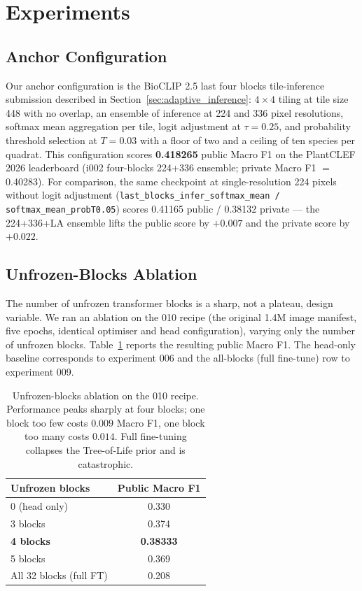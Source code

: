 \documentclass[sigconf]{ceurart}
\begin{document}
\section{Experiments}
\label{sec:experiments}
\subsection{Anchor Configuration}
Our anchor configuration is the BioCLIP 2.5 last four blocks tile-inference submission described in Section~\ref{sec:adaptive_inference}: $4{\times}4$ tiling at tile size 448 with no overlap, an ensemble of inference at 224 and 336 pixel resolutions, softmax mean aggregation per tile, logit adjustment at $\tau{=}0.25$, and probability threshold selection at $T{=}0.03$ with a floor of two and a ceiling of ten species per quadrat. This configuration scores \textbf{0.418265} public Macro F1 on the PlantCLEF 2026 leaderboard (i002 four-blocks 224+336 ensemble; private Macro F1 $=$ 0.40283). For comparison, the same checkpoint at single-resolution 224 pixels without logit adjustment (\texttt{last\_blocks\_infer\_softmax\_mean / softmax\_mean\_probT0.05}) scores 0.41165 public / 0.38132 private --- the 224+336+LA ensemble lifts the public score by $+0.007$ and the private score by $+0.022$.
\subsection{Unfrozen-Blocks Ablation}
\label{sec:blocks_ablation}
The number of unfrozen transformer blocks is a sharp, not a plateau, design variable. We ran an ablation on the 010 recipe (the original 1.4M image manifest, five epochs, identical optimiser and head configuration), varying only the number of unfrozen blocks. Table~\ref{tab:blocks} reports the resulting public Macro F1. The head-only baseline corresponds to experiment 006 and the all-blocks (full fine-tune) row to experiment 009.
\begin{table}[ht]
\centering
\small
\begin{tabular}{lc}
\toprule
Unfrozen blocks & Public Macro F1 \\
\midrule
0 (head only) & 0.330 \\
3 blocks & 0.374 \\
\textbf{4 blocks} & \textbf{0.38333} \\
5 blocks & 0.369 \\
All 32 blocks (full FT) & 0.208 \\
\bottomrule
\end{tabular}
\caption{Unfrozen-blocks ablation on the 010 recipe. Performance peaks sharply at four blocks; one block too few costs $0.009$ Macro F1, one block too many costs $0.014$. Full fine-tuning collapses the Tree-of-Life prior and is catastrophic.}
\label{tab:blocks}
\end{table}
\end{document}
